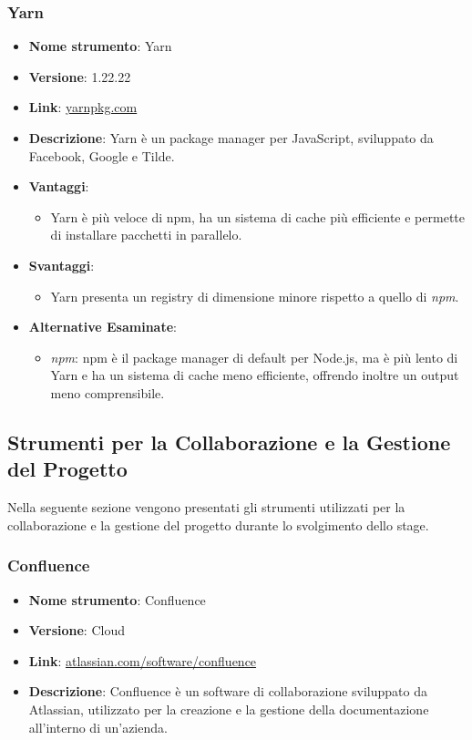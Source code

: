 \subsubsection{Yarn}
\begin{itemize}
      \item \textbf{Nome strumento}: Yarn
      \item \textbf{Versione}: 1.22.22
      \item \textbf{Link}: \href{https://yarnpkg.com/}{yarnpkg.com}
      \item \textbf{Descrizione}: Yarn è un package manager per JavaScript, sviluppato da Facebook, Google e Tilde.
      \item \textbf{Vantaggi}:
            \begin{itemize}
                  \item Yarn è più veloce di npm, ha un sistema di cache più efficiente e permette di installare pacchetti in parallelo.
            \end{itemize}
      \item \textbf{Svantaggi}:
            \begin{itemize}
                  \item Yarn presenta un registry di dimensione minore rispetto a quello di \textit{npm}.
            \end{itemize}
      \item \textbf{Alternative Esaminate}:
            \begin{itemize}
                  \item \textit{npm}: npm è il package manager di default per Node.js, ma è più lento di Yarn e ha un sistema di cache meno efficiente,
                        offrendo inoltre un output meno comprensibile.
            \end{itemize}
\end{itemize}

\subsection{Strumenti per la Collaborazione e la Gestione del Progetto}
Nella seguente sezione vengono presentati gli strumenti utilizzati per la collaborazione e la gestione del progetto durante lo svolgimento dello stage.

\subsubsection{Confluence}
\begin{itemize}
      \item \textbf{Nome strumento}: Confluence
      \item \textbf{Versione}: Cloud
      \item \textbf{Link}: \href{https://www.atlassian.com/software/confluence}{atlassian.com/software/confluence}
      \item \textbf{Descrizione}: Confluence è un software di collaborazione sviluppato da Atlassian, utilizzato per la creazione e la gestione della documentazione
            all'interno di un'azienda.
\end{itemize}

